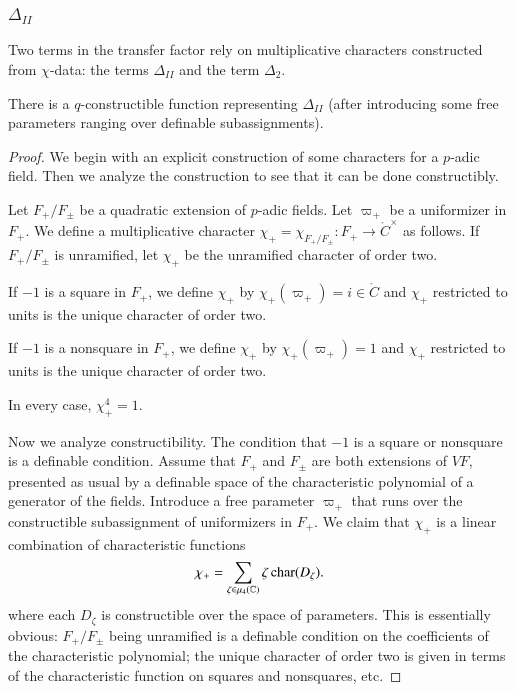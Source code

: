 \subsubsection{$\Delta_{II}$}
Two terms in the transfer factor rely on multiplicative characters constructed from $\chi$-data: the terms $\Delta_{II}$ and the term $\Delta_2$.

\begin{lemma}  There is a $q$-constructible function representing $\Delta_{II}$ (after introducing some free parameters ranging over definable subassignments).
\end{lemma}

\begin{proof}  We begin with an explicit construction of some characters for a $p$-adic field.  Then we analyze the construction to
see that it can be done constructibly.

Let $F_+/F_\pm$ be a quadratic extension of $p$-adic fields.  Let $\varpi_+$ be a uniformizer in $F_+$.  We define a multiplicative character $\chi_+ = \chi_{F_+/F_{\pm}}:F_+\to \ring{C}^\times$
as follows.  If $F_+/F_\pm$ is unramified, let $\chi_+$ be the unramified character of order two.

If $-1$ is a square in $F_+$, we define $\chi_+$ by $\chi_+(\varpi_+) = i\in\ring{C}$ and $\chi_+$ restricted to units is the unique character of order two.

If $-1$ is a nonsquare in $F_+$, we define $\chi_+$ by $\chi_+(\varpi_+)=1$ and $\chi_+$ restricted to units is the unique character of order two.

In every case, $\chi_+^4 = 1$.  

Now we analyze  constructibility.  The condition that $-1$ is a square or nonsquare is a definable condition.
Assume that $F_+$ and $F_\pm$ are both extensions of $VF$, presented as usual by a definable space of the characteristic polynomial of a generator of the fields.  
Introduce a free parameter $\varpi_+$ that runs over the constructible subassignment of uniformizers in $F_+$.
We claim that $\chi_+$ is a linear combination of characteristic functions
\[
\chi_+ = \sum_{\zeta\in\mu_4(\mathbb{C})} \zeta\, {\operatorname{char}}(D_\zeta).
\]
where each $D_\zeta$ is constructible over the space of parameters.  
This is essentially obvious: $F_+/F_\pm$ being unramified is a definable condition on the coefficients of the characteristic polynomial;
the unique character of order two is given in terms of the characteristic function  on squares and nonsquares, etc.


\end{proof}
